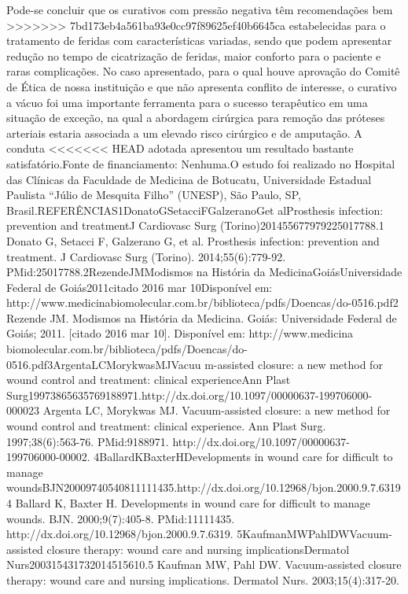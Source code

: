 \documentclass[numberinsection,times,10pt,spreadimages]{memoir}
\begin{document}
Pode-se concluir que os curativos com pressão negativa têm recomendações bem
>>>>>>> 7bd173eb4a561ba93e0cc97f89625ef40b6645ca
estabelecidas para o tratamento de feridas com características variadas, sendo
que
podem apresentar redução no tempo de cicatrização de feridas, maior conforto
para o
paciente e raras complicações. No caso apresentado, para o qual houve aprovação
do
Comitê de Ética de nossa instituição e que não apresenta conflito de interesse,
o
curativo a vácuo foi uma importante ferramenta para o sucesso terapêutico em uma
situação de exceção, na qual a abordagem cirúrgica para remoção das próteses
arteriais estaria associada a um elevado risco cirúrgico e de amputação. A
conduta
<<<<<<< HEAD
adotada apresentou um resultado bastante satisfatório.Fonte de financiamento:
Nenhuma.O estudo foi realizado no Hospital das Clínicas da Faculdade de Medicina
de
Botucatu, Universidade Estadual Paulista “Júlio de Mesquita Filho” (UNESP), São
Paulo, SP, Brasil.REFERÊNCIAS1DonatoGSetacciFGalzeranoGet alProsthesis
infection: prevention and treatmentJ Cardiovasc Surg
(Torino)201455677979225017788.1 Donato G, Setacci F, Galzerano G, et al.
Prosthesis infection:
prevention and treatment. J Cardiovasc Surg (Torino). 2014;55(6):779-92.
PMid:25017788.2RezendeJMModismos na História da MedicinaGoiásUniversidade
Federal de Goiás2011citado 2016 mar 10Disponível em:
http://www.medicinabiomolecular.com.br/biblioteca/pdfs/Doencas/do-0516.pdf2
Rezende JM. Modismos na História da Medicina. Goiás: Universidade
Federal de Goiás; 2011. [citado 2016 mar 10]. Disponível em: http://www.medicina
biomolecular.com.br/biblioteca/pdfs/Doencas/do-0516.pdf3ArgentaLCMorykwasMJVacuu
m-assisted closure: a new method for wound control and
treatment: clinical experienceAnn Plast
Surg19973865635769188971.http://dx.doi.org/10.1097/00000637-199706000-000023
Argenta LC, Morykwas MJ. Vacuum-assisted closure: a new method for
wound control and treatment: clinical experience. Ann Plast Surg.
1997;38(6):563-76. PMid:9188971.
http://dx.doi.org/10.1097/00000637-199706000-00002.
4BallardKBaxterHDevelopments in wound care for difficult to manage
woundsBJN20009740540811111435.http://dx.doi.org/10.12968/bjon.2000.9.7.63194
Ballard K, Baxter H. Developments in wound care for difficult to
manage wounds. BJN. 2000;9(7):405-8. PMid:11111435.
http://dx.doi.org/10.12968/bjon.2000.9.7.6319. 5KaufmanMWPahlDWVacuum-assisted
closure therapy: wound care and nursing
implicationsDermatol Nurs200315431732014515610.5 Kaufman MW, Pahl DW.
Vacuum-assisted closure therapy: wound care
and nursing implications. Dermatol Nurs. 2003;15(4):317-20.
\end{document}
